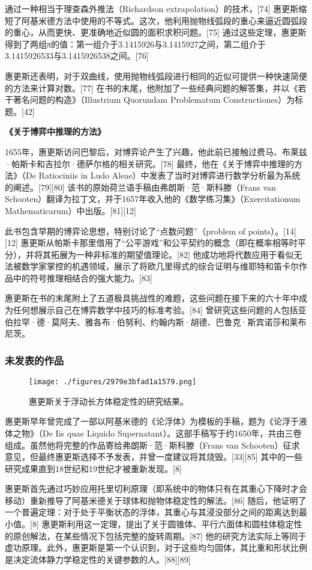 通过一种相当于理查森外推法（Richardson extrapolation）的技术，[74] 惠更斯缩短了阿基米德方法中使用的不等式。这次，他利用抛物线弧段的重心来逼近圆弧段的重心，从而更快、更准确地近似圆的面积求积问题。[75] 通过这些定理，惠更斯得到了两组π的值：第一组介于3.1415926与3.1415927之间，第二组介于3.1415926533与3.1415926538之间。[76]

惠更斯还表明，对于双曲线，使用抛物线弧段进行相同的近似可提供一种快速简便的方法来计算对数。[77] 在书的末尾，他附加了一些经典问题的解答集，并以《若干著名问题的构造》（Illustrium Quorundam Problematum Constructiones）为标题。[42]

\textbf{《关于博弈中推理的方法》}

1655年，惠更斯访问巴黎后，对博弈论产生了兴趣，他此前已接触过费马、布莱兹·帕斯卡和吉拉尔·德萨尔格的相关研究。[78] 最终，他在《关于博弈中推理的方法》（De Ratiociniis in Ludo Aleae）中发表了当时对博弈进行数学分析最为系统的阐述。[79][80] 该书的原始荷兰语手稿由弗朗斯·范·斯科滕（Frans van Schooten）翻译为拉丁文，并于1657年收入他的《数学练习集》（Exercitationum Mathematicarum）中出版。[81][12]

此书包含早期的博弈论思想，特别讨论了“点数问题”（problem of points）。[14][12] 惠更斯从帕斯卡那里借用了“公平游戏”和公平契约的概念（即在概率相等时平分），并将其拓展为一种非标准的期望值理论。[82] 他成功地将代数应用于看似无法被数学家掌控的机遇领域，展示了将欧几里得式的综合证明与维耶特和笛卡尔作品中的符号推理相结合的强大能力。[83]

惠更斯在书的末尾附上了五道极具挑战性的难题，这些问题在接下来的六十年中成为任何想展示自己在博弈数学中技巧的标准考验。[84] 曾研究这些问题的人包括亚伯拉罕·德·莫阿夫、雅各布·伯努利、约翰内斯·胡德、巴鲁克·斯宾诺莎和莱布尼茨。
\subsubsection{未发表的作品}
\begin{figure}[ht]
\centering
\texttt{[image: ./figures/2979e3bfad1a1579.png]}
\caption{惠更斯关于浮动长方体稳定性的研究结果。} \label{fig_HGS_8}
\end{figure}
惠更斯早年曾完成了一部以阿基米德的《论浮体》为模板的手稿，题为《论浮于液体之物》（De Iis quae Liquido Supernatant）。这部手稿写于约1650年，共由三卷组成。虽然他将完整的作品寄给弗朗斯·范·斯科滕（Frans van Schooten）征求意见，但最终惠更斯选择不予发表，并曾一度建议将其烧毁。[33][85] 其中的一些研究成果直到18世纪和19世纪才被重新发现。[8]

惠更斯首先通过巧妙应用托里切利原理（即系统中的物体只有在其重心下降时才会移动）重新推导了阿基米德关于球体和抛物体稳定性的解法。[86] 随后，他证明了一个普遍定理：对于处于平衡状态的浮体，其重心与其浸没部分之间的距离达到最小值。[8] 惠更斯利用这一定理，提出了关于圆锥体、平行六面体和圆柱体稳定性的原创解法，在某些情况下包括完整的旋转周期。[87] 他的研究方法实际上等同于虚功原理。此外，惠更斯是第一个认识到，对于这些均匀固体，其比重和形状比例是决定流体静力学稳定性的关键参数的人。[88][89]








